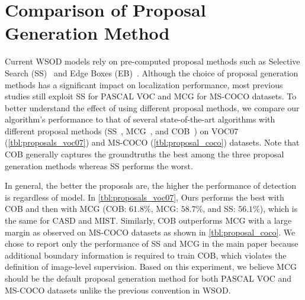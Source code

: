 \documentclass[runningheads]{llncs}
\begin{document}
\clearpage
\section{Comparison of Proposal Generation Method}
\label{sec:performance_proposal_generations}
Current WSOD models rely on pre-computed proposal methods such as Selective Search (SS)~\cite{uijlings2013selective} and Edge Boxes (EB)~\cite{zitnick2014edge}.
Although the choice of proposal generation methods has a significant impact on localization performance,
most previous studies still exploit SS for PASCAL VOC and MCG for MS-COCO datasets.
To better understand the effect of using different proposal methods, we compare our algorithm's performance to that of several state-of-the-art algorithms with different proposal methods (SS~\cite{uijlings2013selective}, MCG~\cite{arbelaez2014multiscale}, and COB~\cite{maninis2016convolutional}) on VOC07 (\cref{tbl:proposals_voc07}) and MS-COCO (\cref{tbl:proposal_coco}) datasets.
Note that COB generally captures the groundtruths the best among the three proposal generation methods whereas SS performs the worst.

In general, the better the proposals are, the higher the performance of detection is regardless of model.
In \cref{tbl:proposals_voc07}, Ours performs the best with COB and then with MCG (COB: $61.8\%$, MCG: $58.7\%$, and SS: $56.1\%$), which is the same for CASD and MIST.
Similarly, COB outperforms MCG with a large margin as observed on MS-COCO datasets as shown in \cref{tbl:proposal_coco}.
We chose to report only the performance of SS and MCG in the main paper because additional boundary information is required to train COB, which violates the definition of image-level supervision.
Based on this experiment, we believe MCG should be the default proposal generation method for both PASCAL VOC and MS-COCO datasets unlike the previous convention in WSOD.
\end{document}
